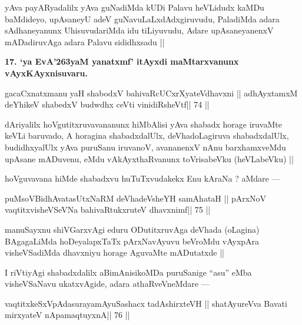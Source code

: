 \begin{artha}
yAva payARyadalilx yAva guNadiMda kUDi Palavu heVLidudx kaMDu 
baMdideyo, upAsaneyU adeV guNavuLaLxdAdxgiruvudu, PaladiMda adara 
sAdhaneyanunx UhisuvudariMda idu tiLiyuvudu, Adare upAsaneyanenxV mADadiruvAga adara Palavu sididhxsadu ||
\end{artha}

\begin{artha}
{\bf 17. `ya EvA\char'263yaM yanatxmf' itAyxdi maMtarxvanunx vAyxKAyxnisuvaru.}
\end{artha} 

\begin{shl}
gacaCxnatxmanu yaH shabodxV bahivaRcUCxrXyateV\s dhavxni ||
adhAyxtamxM deYhikeV shabedxV budwdhx ceVti vinidiRsheVtf\hfill || 74 ||
\end{shl}

\begin{artha}
dAriyalilx hoVgutitxruvavananunx hiMbAlisi yAva shabadx horage iruvaMte 
keVLi baruvado, A horagina shabadxdalUlx, deVhadoLagiruva shabadxdalUlx, budidhxyalUlx yAva puruSanu iruvanoV, avananenxV nAnu barxhamxveMdu upAsane mADuvenu, eMdu vAkAyxthaRvanunx toVrisabeVku (heVLabeVku) ||
\end{artha} 
 
\begin{artha}
hoVguvavana hiMde shabadxvu huTuTxvudakekx Enu kAraNa ? aMdare ---
\end{artha} 

\begin{shl}
puMsoV\s BidhAvatasUtxNaRM deVhadeVsheYH samAhataH ||
pArxNoV vaqtitxvisheVSeVNa bahivaRtukxruteV dhavxnimf\hfill || 75 ||
\end{shl}

\begin{artha}
manuSayxnu shiVGarxvAgi eduru ODutitxruvAga deVhada (oLagina) BAgagaLiMda hoDeyalapxTaTx pArxNavAyuvu beVroMdu vAyxpAra visheVSadiMda dhavxniyu horage AguvaMte mADutatxde ||
\end{artha} 
 
\begin{artha}
I riVtiyAgi shabadxdalilx aBimAnisikoMDa puruSanige ``asu'' eMba visheVSaNavu ukatxvAgide, adara athaRveVneMdare --- 
\end{artha} 

\begin{shl}
\footnotemark[9]vaqtitxkeSxVpAdasurayamAyuSashacx tadAshirxteVH ||
shatAyureVva Bavati mirxyateV nApamaqtuyxnA\hfill || 76 ||
\end{shl}


